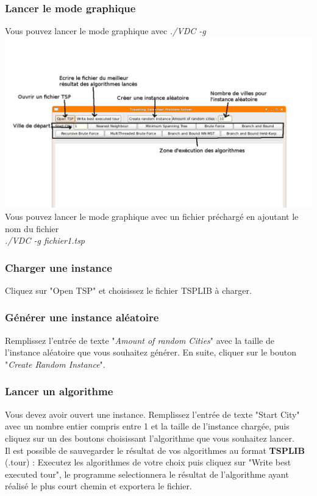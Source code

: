 \documentclass[12pt]{report}
\begin{document}
\subsubsection{Lancer le mode graphique}
Vous pouvez lancer le mode graphique avec \emph{./VDC -g} \\
\includegraphics[width=\textwidth]{TSP_GUI.png} \\

Vous pouvez lancer le mode graphique avec un fichier préchargé en ajoutant le nom du fichier \\
\emph{./VDC -g fichier1.tsp}

\subsubsection[scale=0.4]{Charger une instance}

Cliquez sur "Open TSP" et choisissez le fichier TSPLIB à charger.

\subsubsection{Générer une instance aléatoire}

Remplissez l'entrée de texte "\textit{Amount of random Cities}" avec la taille de l'instance aléatoire que vous souhaitez générer. En suite, cliquer sur le bouton "\textit{Create Random Instance}".

\subsubsection{Lancer un algorithme}

Vous devez avoir ouvert une instance. Remplissez l'entrée de texte "Start City" avec un nombre entier compris entre 1 et la taille de l'instance chargée, puis cliquez sur un des boutons choisissant l'algorithme que vous souhaitez lancer.\\
Il est possible de sauvegarder le résultat de vos algorithmes au format \textbf{TSPLIB} (.tour) : Executez les algorithmes de votre choix puis cliquez sur "Write best executed tour", le programme selectionnera le résultat de l'algorithme ayant réalisé le plus court chemin et exportera le fichier.
\end{document}
